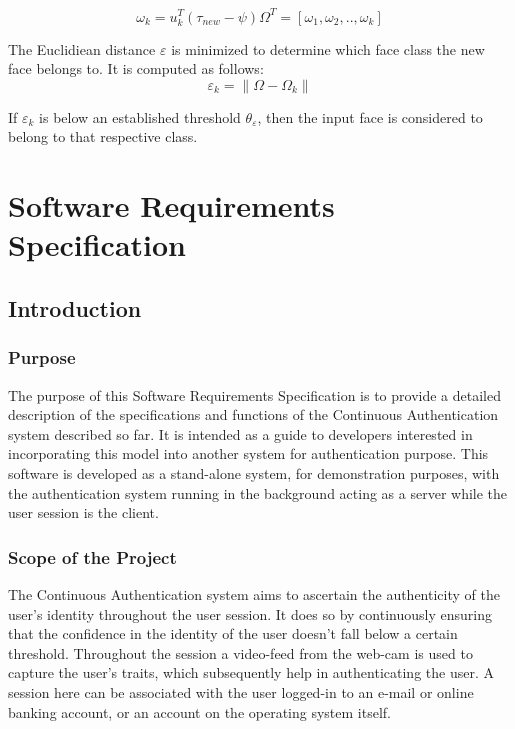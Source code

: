 \documentclass[12pt]{article}			%
\begin{document}
\begin{equation}
\omega_{k} = u_{k}^{T}(\tau_{new} - \psi)	\Omega^{T} = [\omega_{1},\omega_{2},..,\omega_{k}] 
\end{equation}

The Euclidiean distance $\varepsilon$ is minimized to determine which face class the new face belongs to. It is computed as follows:
\begin{equation}
\varepsilon_{k} = \parallel\Omega - \Omega_{k}\parallel 
\end{equation}

If $\varepsilon_{k}$ is below an established threshold $\theta_{\varepsilon}$, then the input face is considered to belong to that respective class.


\newpage
\section{Software Requirements Specification }
\subsection{ Introduction }

\subsubsection{ Purpose }
The purpose of this Software Requirements Specification is to provide a detailed description of the specifications and functions of the Continuous Authentication system described so far. It is intended as a guide to developers interested in incorporating this model into another system for authentication purpose. This software is developed as a stand-alone system, for demonstration purposes, with the authentication system running in the background acting as a server while the user session is the client. 

\subsubsection{ Scope of the Project }
The Continuous Authentication system aims to ascertain the authenticity of the user's identity throughout the user session. It does so by continuously ensuring that the confidence in the identity of the user doesn't fall below a certain threshold. Throughout the session a video-feed from the web-cam is used to capture the user's traits, which subsequently help in authenticating the user. A session here can be associated with the user logged-in to an e-mail or online banking account, or an account on the operating system itself.
\end{document}
